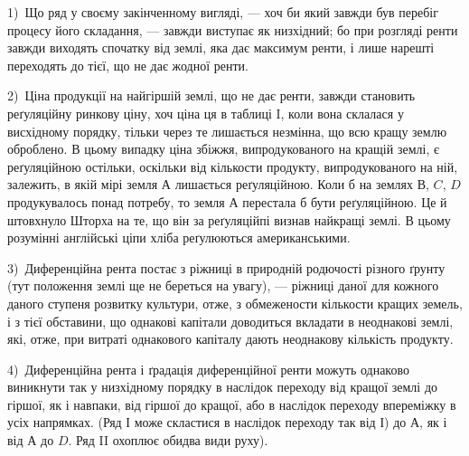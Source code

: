 
1)~Що ряд у своєму закінченному вигляді, — хоч би який завжди був перебіг процесу його складання, —
завжди виступає як низхідний; бо при розгляді ренти завжди виходять спочатку від землі, яка дає
максимум ренти, і лише нарешті переходять до тієї, що не дає жодної ренти.

2)~Ціна продукції на найгіршій землі, що не дає ренти, завжди становить реґуляційну ринкову ціну,
хоч ціна ця в таблиці I, коли вона склалася у висхідному порядку, тільки через те лишається
незмінна, що всю кращу землю оброблено. В цьому випадку ціна збіжжя, випродукованого на кращій
землі, є реґуляційною остільки, оскільки від кількости продукту, випродукованого на ній, залежить, в
якій мірі земля $А$ лишається реґуляційною. Коли б на землях $В$, $C$, $D$ продукувалось понад потребу, то
земля $А$ перестала б бути реґуляційною. Це й штовхнуло Шторха на те, що він за реґуляційпі визнав
найкращі землі. В цьому розумінні англійські ціпи хліба реґулюються американськими.

3)~Диференційна рента постає з ріжниці в природній родючості різного ґрунту (тут положення землі ще
не береться на увагу), — ріжниці даної для кожного даного ступеня розвитку культури, отже, з
обмежености кількости кращих земель, і з тієї обставини, що однакові капітали доводиться вкладати в
неоднакові землі, які, отже, при витраті однакового капіталу дають неоднакову кількість продукту.

4)~Диференційна рента і ґрадація диференційної ренти можуть однаково виникнути так у низхідному
порядку в наслідок переходу від кращої землі до гіршої, як і навпаки, від гіршої до кращої, або в
наслідок переходу впереміжку в усіх напрямках. (Ряд І може скластися в наслідок переходу так від І)
до $А$, як і від $А$ до $D$. Ряд II охоплює обидва види руху).

